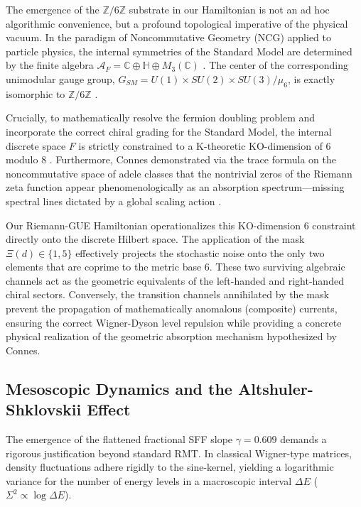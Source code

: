 \documentclass[aps,prl,preprint,superscriptaddress,floatfix]{revtex4-2}
\begin{document}
The emergence of the $\mathbb{Z}/6\mathbb{Z}$ substrate in our Hamiltonian is not an ad hoc algorithmic convenience, but a profound topological imperative of the physical vacuum. In the paradigm of Noncommutative Geometry (NCG) applied to particle physics, the internal symmetries of the Standard Model are determined by the finite algebra $\mathcal{A}_F = \mathbb{C} \oplus \mathbb{H} \oplus M_3(\mathbb{C})$ \cite{Chamseddine2007, Connes2008}. The center of the corresponding unimodular gauge group, $G_{SM} = U(1) \times SU(2) \times SU(3) / \mu_6$, is exactly isomorphic to $\mathbb{Z}/6\mathbb{Z}$ \cite{Connes2008}.

Crucially, to mathematically resolve the fermion doubling problem and incorporate the correct chiral grading for the Standard Model, the internal discrete space $F$ is strictly constrained to a K-theoretic KO-dimension of 6 modulo 8 \cite{Connes2008}. Furthermore, Connes demonstrated via the trace formula on the noncommutative space of adele classes that the nontrivial zeros of the Riemann zeta function appear phenomenologically as an absorption spectrum---missing spectral lines dictated by a global scaling action \cite{Connes1999}.

Our Riemann-GUE Hamiltonian operationalizes this KO-dimension 6 constraint directly onto the discrete Hilbert space. The application of the mask $\Xi(d) \in \{1,5\}$ effectively projects the stochastic noise onto the only two elements that are coprime to the metric base 6. These two surviving algebraic channels act as the geometric equivalents of the left-handed and right-handed chiral sectors. Conversely, the transition channels annihilated by the mask prevent the propagation of mathematically anomalous (composite) currents, ensuring the correct Wigner-Dyson level repulsion while providing a concrete physical realization of the geometric absorption mechanism hypothesized by Connes.

\subsection{Mesoscopic Dynamics and the Altshuler-Shklovskii Effect}

The emergence of the flattened fractional SFF slope $\gamma = 0.609$ demands a rigorous justification beyond standard RMT. In classical Wigner-type matrices, density fluctuations adhere rigidly to the sine-kernel, yielding a logarithmic variance for the number of energy levels in a macroscopic interval $\Delta E$ ($\Sigma^2 \propto \log \Delta E$).
\end{document}
